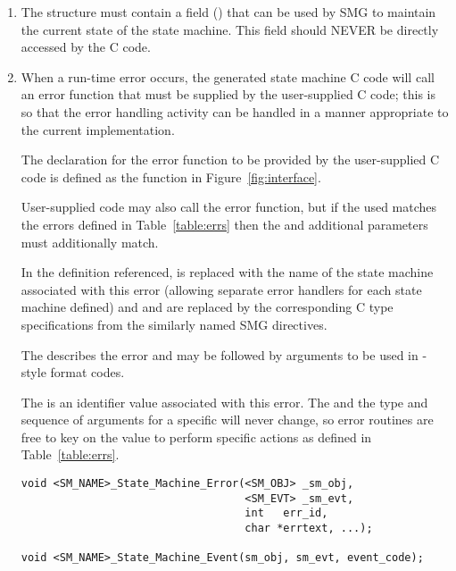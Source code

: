 \begin{enumerate}
  
\item The \SMOBJ structure must contain a field () that
  can be used by SMG to maintain the current state of the state
  machine.  This field should NEVER be directly accessed by the C
  code.

   
\item When a run-time error occurs, the generated state machine C code
  will call an error function that must be supplied by the user-supplied
  C code; this is so that the error handling activity can be handled
  in a manner appropriate to the current implementation.
  
  The declaration for the error function to be provided by the
  user-supplied C code is defined as the
   function in
  Figure~\ref{fig:interface}.
  
  User-supplied code may also call the error function, but if the
   used matches the errors defined in
  Table~\ref{table:errs} then the  and additional
  parameters must additionally match.
  
  In the definition referenced,  is replaced with the
  name of the state machine associated with this error (allowing
  separate error handlers for each state machine defined) and
   and  are replaced by the
  corresponding C type specifications from the similarly named SMG
  directives.
  
  The  describes the error and may be followed by
  arguments to be used in -style format codes.
  
  The  is an identifier value associated with this error.
  The  and the type and sequence of arguments for a
  specific  will never change, so error routines are free
  to key on the  value to perform specific actions as
  defined in Table~\ref{table:errs}.

\begin{figure*}[tb]
\begin{verbatim}
void <SM_NAME>_State_Machine_Error(<SM_OBJ> _sm_obj,
                                   <SM_EVT> _sm_evt,
                                   int   err_id,
                                   char *errtext, ...);

void <SM_NAME>_State_Machine_Event(sm_obj, sm_evt, event_code);


\end{verbatim}
\end{figure*}
\end{enumerate}
